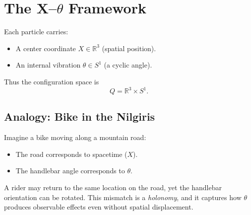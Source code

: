 \section{The X--$\theta$ Framework}

Each particle carries:
\begin{itemize}
  \item A center coordinate $X \in \mathbb{R}^3$ (spatial position).
  \item An internal vibration $\theta \in S^1$ (a cyclic angle).
\end{itemize}

Thus the configuration space is
\begin{equation}
Q = \mathbb{R}^3 \times S^1 .
\end{equation}

\subsection*{Analogy: Bike in the Nilgiris}
Imagine a bike moving along a mountain road:
\begin{itemize}
  \item The road corresponds to spacetime ($X$).
  \item The handlebar angle corresponds to $\theta$.
\end{itemize}
A rider may return to the same location on the road, yet the handlebar orientation
can be rotated. This mismatch is a \emph{holonomy}, and it captures how $\theta$
produces observable effects even without spatial displacement.
